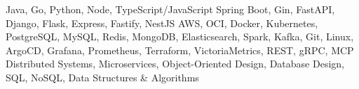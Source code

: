 \addvspace{-1.5ex}
\begin{cvskills}
    {Java, Go, Python, Node, TypeScript/JavaScript}
    {Spring Boot, Gin, FastAPI, Django, Flask, Express, Fastify, NestJS}
    {AWS, OCI, Docker, Kubernetes, PostgreSQL, MySQL, Redis, MongoDB, Elasticsearch, Spark,
    \newline Kafka, Git, Linux, ArgoCD, Grafana, Prometheus, Terraform, VictoriaMetrics, REST, gRPC, MCP}
    {Distributed Systems, Microservices, Object-Oriented Design, Database Design, SQL, NoSQL,
    \newline Data Structures \& Algorithms}
\end{cvskills}
